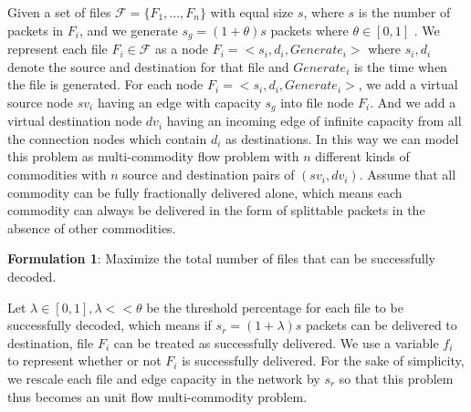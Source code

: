 \documentclass[onecolumn,11pt,journal, compsoc]{IEEEtran}
\begin{document}
	Given a set of files $\mathcal F = \{F_1, ..., F_n\}$ with equal size $s$, where $s$ is the number of packets in $F_i$, and we generate $s_g = (1+\theta)s$ packets where $\theta \in [0, 1] $ . We represent each file $F_i \in \mathcal F$ as a node $F_i=<s_i, d_i, Generate_i>$ where $s_i, d_i$ denote the source and destination for that file and $Generate_i$ is the time when the file is generated. For each node $F_i=<s_i, d_i, Generate_i>$, we add a virtual source node $sv_i$ having an edge with capacity $s_g$ into file node $F_i$. And we add a virtual destination node $dv_i$ having an incoming edge of infinite capacity from all the connection nodes which contain $d_i$ as destinations. In this way we can model this problem as multi-commodity flow problem with $n$ different kinds of commodities with $n$ source and destination pairs of $(sv_i, dv_i)$. Assume that all commodity can be fully fractionally delivered alone, which means each commodity can always be delivered in the form of splittable packets in the absence of other commodities.
	
	
	\textbf{Formulation 1}: Maximize the total number of files that can be successfully decoded.
	
	Let $\lambda \in [0, 1], \lambda << \theta$ be the threshold percentage for each file to be successfully decoded, which means if $s_r = (1+\lambda)s$ packets can be delivered to destination, file $F_i$ can be treated as successfully delivered. We use a variable $f_i$ to represent whether or not $F_i$ is successfully delivered. For the sake of simplicity, we rescale each file and edge capacity in the network by $s_r$ so that this problem thus becomes an unit flow multi-commodity problem.
	
\end{document}
